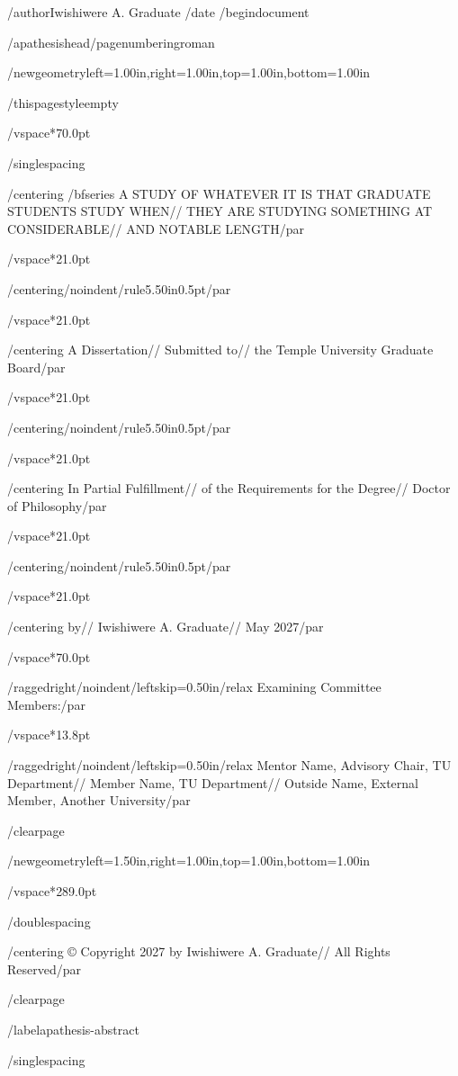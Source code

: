 /author{Iwishiwere A. Graduate}
/date{}
/begin{document}


/apathesishead/pagenumbering{roman}

/newgeometry{left=1.00in,right=1.00in,top=1.00in,bottom=1.00in}

/thispagestyle{empty}

/vspace*{70.0pt}

/singlespacing

{/centering
/bfseries A STUDY OF WHATEVER IT IS THAT GRADUATE STUDENTS STUDY WHEN//
THEY ARE STUDYING SOMETHING AT CONSIDERABLE//
AND NOTABLE LENGTH/par}

/vspace*{21.0pt}

{/centering/noindent/rule{5.50in}{0.5pt}/par}

/vspace*{21.0pt}

{/centering
A Dissertation//
Submitted to//
the Temple University Graduate Board/par}

/vspace*{21.0pt}

{/centering/noindent/rule{5.50in}{0.5pt}/par}

/vspace*{21.0pt}

{/centering
In Partial Fulfillment//
of the Requirements for the Degree//
Doctor of Philosophy/par}

/vspace*{21.0pt}

{/centering/noindent/rule{5.50in}{0.5pt}/par}

/vspace*{21.0pt}

{/centering
by//
Iwishiwere A. Graduate//
May 2027/par}

/vspace*{70.0pt}

{/raggedright/noindent/leftskip=0.50in/relax
Examining Committee Members:/par}

/vspace*{13.8pt}

{/raggedright/noindent/leftskip=0.50in/relax
Mentor Name, Advisory Chair, TU Department//
Member Name, TU Department//
Outside Name, External Member, Another University/par}

/clearpage

/newgeometry{left=1.50in,right=1.00in,top=1.00in,bottom=1.00in}

/vspace*{289.0pt}

/doublespacing

{/centering
© Copyright 2027 by Iwishiwere A. Graduate//
All Rights Reserved/par}

/clearpage

/label{apathesis-abstract}

/singlespacing

